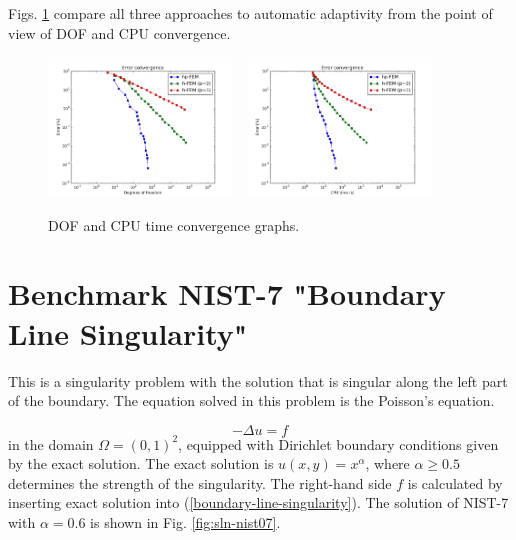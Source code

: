 \documentclass[12pt]{elsarticle}
\begin{document}
Figs. \ref{fig:nist-6-conv} compare all
three approaches to automatic adaptivity from the point
of view of DOF and CPU convergence.

\begin{figure}[H]
\centering
\vspace{-5mm}
\includegraphics[height=3.7cm]{nist/nist-6/conv_dof_aniso.png}\ \
\includegraphics[height=3.7cm]{nist/nist-6/conv_cpu_aniso.png}
\vspace{-5mm}
\caption{DOF and CPU time convergence graphs.}
\vspace{-5mm}
\label{fig:nist-6-conv}
\end{figure}


\section{Benchmark NIST-7 "Boundary Line Singularity"}
\label{sec:bench-7}

This is a singularity problem with the solution that is singular along the left part of the boundary.
The equation solved in this problem is the Poisson's equation.

\begin{equation} \label{boundary-line-singularity}
-\Delta u = f
\end{equation}
in the domain $\Omega = (0, 1)^2$, equipped with Dirichlet boundary conditions
given by the exact solution. The exact solution is
$u(x,y) = x^{\alpha}$,
where $\alpha \geq 0.5$ determines the strength of the singularity.
The right-hand side $f$ is calculated by inserting exact solution into (\ref{boundary-line-singularity}).
The solution of NIST-7 with $\alpha = 0.6$ is shown in Fig. \ref{fig:sln-nist07}.
\end{document}
